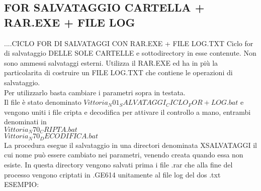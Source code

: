 \documentclass[10pt,a4paper]{book}
\begin{document}
	
	\subsection{FOR SALVATAGGIO CARTELLA + RAR.EXE + FILE LOG}
		\label{FOR:SALVATAGGI-DirectoryConRAR+LOG}{....CICLO FOR DI SALVATAGGI CON RAR.EXE + FILE LOG.TXT}
		Ciclo for di salvataggio DELLE SOLE CARTELLE e sottodirectory in esse contenute.
		Non sono ammessi salvataggi esterni. Utilizza il RAR.EXE ed ha in più la particolarita
		di costruire un FILE LOG.TXT che contiene le operazioni di salvataggio.
		\\
		Per utilizzarlo basta cambiare i parametri sopra in testata.
		\\
		Il file è stato denominato $Vittoria_N01_SALVATAGGI_CICLO_FOR+LOG.bat$ e vengono
		uniti i file cripta e decodifica per attivare il controllo a mano, entrambi denominati in\\
		$Vittoria_N70_CRIPTA.bat$\\
		$Vittoria_N70_DECODIFICA.bat$\\
		La procedura esegue il salvataggio in una directori denominata XSALVATAGGI il cui nome può
		essere cambiato nei parametri, venendo creata quando essa non esiste. In questa directory
		vengono salvati prima i file .rar che alla fine del processo vengono criptati in .GE614 
		unitamente al file log del dos .txt
		\\
		ESEMPIO:\\
		
\end{document}
